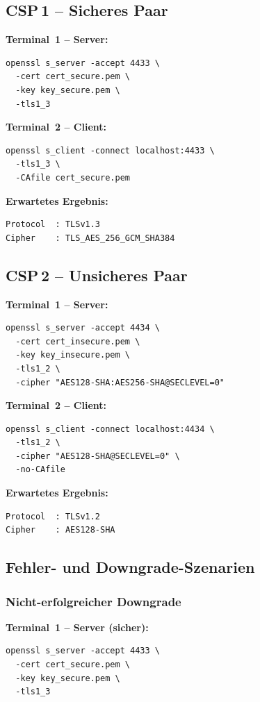 \subsection*{CSP\,1 -- Sicheres Paar}
\noindent\textbf{Terminal~1 -- Server:}
\begin{lstlisting}[style=consolestyle]
openssl s_server -accept 4433 \
  -cert cert_secure.pem \
  -key key_secure.pem \
  -tls1_3
\end{lstlisting}

\noindent\textbf{Terminal~2 -- Client:}
\begin{lstlisting}[style=consolestyle]
openssl s_client -connect localhost:4433 \
  -tls1_3 \
  -CAfile cert_secure.pem
\end{lstlisting}

\noindent\textbf{Erwartetes Ergebnis:}
\begin{lstlisting}
Protocol  : TLSv1.3
Cipher    : TLS_AES_256_GCM_SHA384
\end{lstlisting}

\subsection*{CSP\,2 -- Unsicheres Paar}
\noindent\textbf{Terminal~1 -- Server:}
\begin{lstlisting}[style=consolestyle]
openssl s_server -accept 4434 \
  -cert cert_insecure.pem \
  -key key_insecure.pem \
  -tls1_2 \
  -cipher "AES128-SHA:AES256-SHA@SECLEVEL=0"
\end{lstlisting}

\noindent\textbf{Terminal~2 -- Client:}
\begin{lstlisting}[style=consolestyle]
openssl s_client -connect localhost:4434 \
  -tls1_2 \
  -cipher "AES128-SHA@SECLEVEL=0" \
  -no-CAfile
\end{lstlisting}

\noindent\textbf{Erwartetes Ergebnis:}
\begin{lstlisting}
Protocol  : TLSv1.2
Cipher    : AES128-SHA
\end{lstlisting}

\subsection*{Fehler- und Downgrade-Szenarien}

\subsubsection*{Nicht-erfolgreicher Downgrade}
\noindent\textbf{Terminal~1 -- Server (sicher):}
\begin{lstlisting}[style=consolestyle]
openssl s_server -accept 4433 \
  -cert cert_secure.pem \
  -key key_secure.pem \
  -tls1_3
\end{lstlisting}

